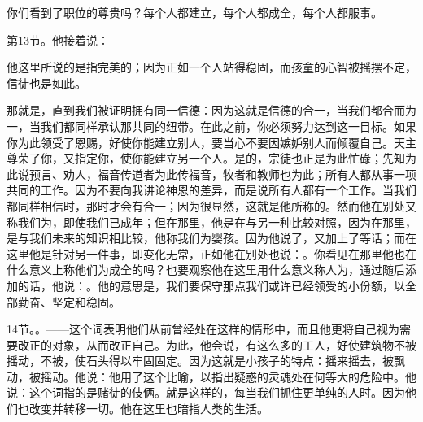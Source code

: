 \par

你们看到了职位的尊贵吗？每个人都建立，每个人都成全，每个人都服事。\par

第13节。他接着说：\par

他这里所说的是指完美的；因为正如一个人站得稳固，而孩童的心智被摇摆不定，信徒也是如此。\par

\par

那就是，直到我们被证明拥有同一信德：因为这就是信德的合一，当我们都合而为一，当我们都同样承认那共同的纽带。在此之前，你必须努力达到这一目标。如果你为此领受了恩赐，好使你能建立别人，要当心不要因嫉妒别人而倾覆自己。天主尊荣了你，又指定你，使你能建立另一个人。是的，宗徒也正是为此忙碌；先知为此说预言、劝人，福音传道者为此传福音，牧者和教师也为此；所有人都从事一项共同的工作。因为不要向我讲论神恩的差异，而是说所有人都有一个工作。当我们都同样相信时，那时才会有合一；因为很显然，这就是他所称的。然而他在别处又称我们为，即使我们已成年；但在那里，他是在与另一种比较对照，因为在那里，是与我们未来的知识相比较，他称我们为婴孩。因为他说了，又加上了等话；而在这里他是针对另一件事，即变化无常，正如他在别处也说：。你看见在那里他也在什么意义上称他们为成全的吗？也要观察他在这里用什么意义称人为，通过随后添加的话，他说：。他的意思是，我们要保守那点我们或许已经领受的小份额，以全部勤奋、坚定和稳固。\par

14节。。——这个词表明他们从前曾经处在这样的情形中，而且他更将自己视为需要改正的对象，从而改正自己。为此，他会说，有这么多的工人，好使建筑物不被摇动，不被，使石头得以牢固固定。因为这就是小孩子的特点：摇来摇去，被飘动，被摇动。他说：他用了这个比喻，以指出疑惑的灵魂处在何等大的危险中。他说：这个词指的是赌徒的伎俩。就是这样的，每当我们抓住更单纯的人时。因为他们也改变并转移一切。他在这里也暗指人类的生活。\par

